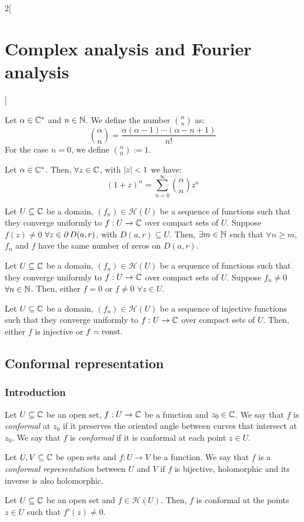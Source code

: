 \documentclass[../../../main.tex]{subfiles}
\begin{document}
\begin{multicols}{2}[\section{Complex analysis and Fourier analysis}]
\begin{theorem}
  \end{theorem}
  \begin{definition}
    Let $\alpha\in\mathbb{C}^*$ and $n\in\mathbb{N}$. We define the number $\binom{\alpha}{n}$ as: $$\binom{\alpha}{n}=\frac{\alpha(\alpha-1)\cdots(\alpha-n+1)}{n!}$$ For the case $n=0$, we define $\binom{\alpha}{0}:=1$.
  \end{definition}
  \begin{theorem}
    Let $\alpha\in\mathbb{C}^*$. Then, $\forall z\in\mathbb{C}$, with $\abs{z}<1$ we have: $${(1+z)}^\alpha=\sum_{n=0}^\infty\binom{\alpha}{n}z^n$$
  \end{theorem}
  \begin{theorem}
    Let $U\subseteq \mathbb{C}$ be a domain, $(f_n)\in\mathcal{H}(U)$ be a sequence of functions such that they converge uniformly to $f:U\rightarrow\mathbb{C}$ over compact sets of $U$. Suppose $f(z)\ne 0$ $\forall z\in\operatorname{\partial}{D(a,r)}$, with $D(a,r)\subseteq U$. Then, $\exists m\in\mathbb{N}$ such that $\forall n\geq m$, $f_n$ and $f$ have the same number of zeros on $D(a,r)$.
  \end{theorem}
  \begin{corollary}
    Let $U\subseteq \mathbb{C}$ be a domain, $(f_n)\in\mathcal{H}(U)$ be a sequence of functions such that they converge uniformly to $f:U\rightarrow\mathbb{C}$ over compact sets of $U$. Suppose $f_n\ne 0$ $\forall n\in\mathbb{N}$. Then, either $f=0$ or $f\ne 0$ $\forall z\in U$.
  \end{corollary}
  \begin{corollary}
    Let $U\subseteq \mathbb{C}$ be a domain, $(f_n)\in\mathcal{H}(U)$ be a sequence of injective functions such that they converge uniformly to $f:U\rightarrow\mathbb{C}$ over compact sets of $U$. Then, either $f$ is injective or $f=\text{const.}$
  \end{corollary}
  \subsection{Conformal representation}
  \subsubsection{Introduction}
  \begin{definition}
    Let $U\subseteq \mathbb{C}$ be an open set, $f:U\rightarrow\mathbb{C}$ be a function and $z_0\in\mathbb{C}$. We say that $f$ is \emph{conformal} at $z_0$ if it preserves the oriented angle between curves that intersect at $z_0$. We say that $f$ is \emph{conformal} if it is conformal at each point $z\in U$.
  \end{definition}
  \begin{definition}
    Let $U,V\subseteq \mathbb{C}$ be open sets and $f:U\rightarrow V$ be a function. We say that $f$ is a \emph{conformal representation} between $U$ and $V$ if $f$ is bijective, holomorphic and its inverse is also holomorphic.
  \end{definition}
  \begin{theorem}
    Let $U\subseteq \mathbb{C}$ be an open set and $f\in\mathcal{H}(U)$. Then, $f$ is conformal at the points $z\in U$ such that $f'(z)\ne 0$.
  \end{theorem}

\end{multicols}
\end{document}
